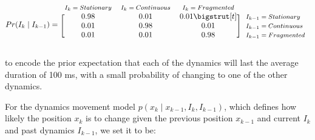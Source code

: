 \documentclass[9pt,lineno]{elife}
\begin{document}
\begin{equation*}
  Pr(I_{k} \mid I_{k-1}) = 
  \begin{blockarray}{*{3}{c} l}
    \begin{block}{*{3}{>{$\footnotesize}c<{$}} l}
      $I_{k} = Stationary$ & $I_{k} = Continuous$ & $I_{k} = Fragmented$ \\
    \end{block}
    \begin{block}{[*{3}{c}]>{$\footnotesize}l<{$}}
      0.98 & 0.01 & 0.01 \bigstrut[t]& $I_{k-1} = Stationary$ \\
      0.01 & 0.98 & 0.01 & $I_{k-1} = Continuous$ \\
      0.01 & 0.01 & 0.98 & $I_{k-1} = Fragmented$ \\
    \end{block}
  \end{blockarray}
\end{equation*}

to encode the prior expectation that each of the dynamics will last the average duration of 100 ms, with a small probability of changing to one of the other dynamics.

For the dynamics movement model $p(x_{k} \mid x_{k-1}, I_{k}, I_{k-1})$, which defines how likely the position $x_{k}$ is to change given the previous position $x_{k-1}$ and current $I_{k}$ and past dynamics $I_{k-1}$, we set it to be:
\end{document}
